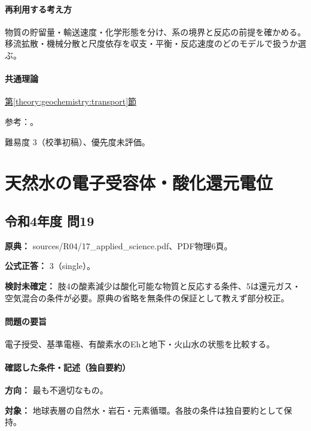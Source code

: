 \paragraph{再利用する考え方} 物質の貯留量・輸送速度・化学形態を分け、系の境界と反応の前提を確かめる。移流拡散・機械分散と尺度依存を収支・平衡・反応速度のどのモデルで扱うか選ぶ。

\paragraph{共通理論} \hyperref[theory:geochemistry:transport]{第\ref*{theory:geochemistry:transport}節}

\par 参考：\cite{gc_dispersion,gc_hem}。

\par 難易度 3（校準初稿）、優先度未評価。

\section{天然水の電子受容体・酸化還元電位}

\subsection{令和4年度 問19}
\label{q:r04-reg-applied-19}

\noindent\textbf{原典：} sources/R04/17\_applied\_science.pdf、PDF物理6頁。

\textbf{公式正答：} 3（single）。

\par\textbf{検討未確定：} 肢4の酸素減少は酸化可能な物質と反応する条件、5は還元ガス・空気混合の条件が必要。原典の省略を無条件の保証として教えず部分校正。

\paragraph{問題の要旨} 電子授受、基準電極、有酸素水のEhと地下・火山水の状態を比較する。

\paragraph{確認した条件・記述（独自要約）}\mbox{}\par

\noindent\textbf{方向：} 最も不適切なもの。\par

\noindent\textbf{対象：} 地球表層の自然水・岩石・元素循環。各肢の条件は独自要約として保持。\par


